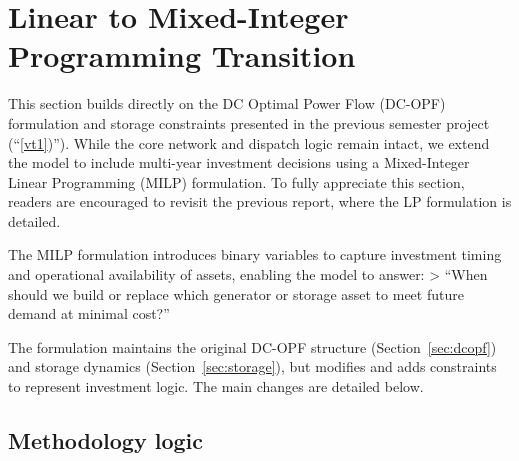 \newpage
\section{Linear to Mixed-Integer Programming Transition}
\label{sec:MILP_transition}

This section builds directly on the DC Optimal Power Flow (DC-OPF) formulation and storage constraints presented in the previous semester project (“\href{https://github.com/vierui/vt1-energy-investment-model/blob/master/report/main.pdf}
{[vt1]})”). While the core network and dispatch logic remain intact, we extend the model to include multi-year investment decisions using a Mixed-Integer Linear Programming (MILP) formulation. To fully appreciate this section, readers are encouraged to revisit the previous report, where the LP formulation is detailed.

The MILP formulation introduces binary variables to capture investment timing and operational availability of assets, enabling the model to answer:
> “When should we build or replace which generator or storage asset to meet future demand at minimal cost?”

The formulation maintains the original DC-OPF structure (Section~\ref{sec:dcopf}) and storage dynamics (Section~\ref{sec:storage}), but modifies and adds constraints to represent investment logic. The main changes are detailed below.

\subsection{Methodology logic}
\label{ssec:MILP_methodology}

